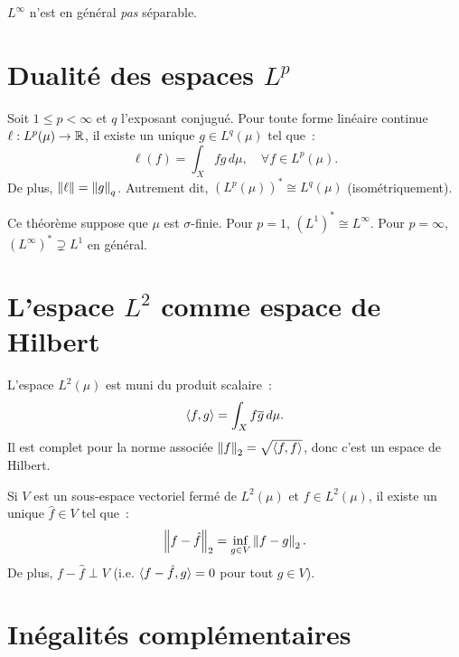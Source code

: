 \begin{remarque}
$L^\infty$ n'est en g\'en\'eral \emph{pas} s\'eparable.
\end{remarque}

\section{Dualit\'e des espaces $L^p$}

\begin{theoreme}[Dualit\'e $L^p$--$L^q$]
\label{thm:dualite_lp}
Soit $1 \leq p < \infty$ et $q$ l'exposant conjugu\'e. Pour toute forme lin\'eaire
continue $\ell : L^p(\mu) \to \mathbb{R}$, il existe un unique $g \in L^q(\mu)$ tel que~:
\[
\ell(f) = \int_X fg\, d\mu, \quad \forall f \in L^p(\mu).
\]
De plus, $\left\| \ell \right\| = \left\| g \right\|_q$. Autrement dit, $(L^p(\mu))^* \cong L^q(\mu)$
(isom\'etriquement).
\end{theoreme}

\begin{remarque}
Ce th\'eor\`eme suppose que $\mu$ est $\sigma$-finie. Pour $p = 1$,
$(L^1)^* \cong L^\infty$. Pour $p = \infty$, $(L^\infty)^* \supsetneq L^1$
en g\'en\'eral.
\end{remarque}

\section{L'espace $L^2$ comme espace de Hilbert}

\begin{definition}
L'espace $L^2(\mu)$ est muni du produit scalaire~:
\[
\langle f, g \rangle = \int_X f \overline{g}\, d\mu.
\]
Il est complet pour la norme associ\'ee $\left\| f \right\|_2 = \sqrt{\langle f, f \rangle}$, donc
c'est un espace de Hilbert.
\end{definition}

\begin{theoreme}
Si $V$ est un sous-espace vectoriel ferm\'e de $L^2(\mu)$ et $f \in L^2(\mu)$, il
existe un unique $\hat{f} \in V$ tel que~:
\[
\left\| f - \hat{f} \right\|_2 = \inf_{g \in V} \left\| f - g \right\|_2.
\]
De plus, $f - \hat{f} \perp V$ (i.e. $\langle f - \hat{f}, g \rangle = 0$ pour tout
$g \in V$).
\end{theoreme}

\section{In\'egalit\'es compl\'ementaires}


